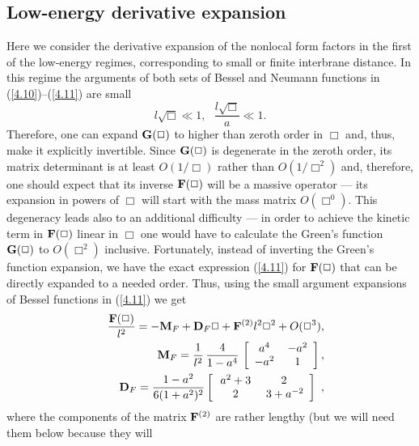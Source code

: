 \documentclass[a4paper,preprint,nofootinbib,
                 showpacs,preprintnumbers,amsmath,amssymb]{revtex4}
\begin{document}
\subsection{Low-energy derivative expansion  
\label{particle}} 
Here we consider the derivative expansion of the nonlocal form factors 
in the first of the low-energy regimes, corresponding to 
small or finite interbrane distance. In this regime the arguments 
of both sets of Bessel and Neumann functions in 
(\ref{4.10})--(\ref{4.11}) are small 
    \begin{equation} 
    l\sqrt\Box\ll 1,\,\,\,\, \frac{l\sqrt\Box}a\ll 1.  \label{4.19} 
    \end{equation} 
Therefore, one can expand ${\bf G}(\Box)$ to higher than 
zeroth order in $\Box$ and, thus, make it explicitly invertible. 
Since ${\bf G}(\Box)$ is degenerate in the zeroth order, its 
matrix determinant is at least $O(1/\Box)$ rather than 
$O(1/\Box^2)$ and, therefore, one should expect that its inverse 
${\bf F}(\Box)$ will be a massive operator 
--- its expansion in powers of $\Box$ will start with the mass 
matrix $O(\Box^0)$. This degeneracy leads also to an additional 
difficulty --- in order to achieve the kinetic term in ${\bf 
F}(\Box)$ linear in $\Box$ one would have to calculate the Green's 
function ${\bf G}(\Box)$ to $O(\Box^2)$ inclusive.  
Fortunately, instead of inverting the Green's function expansion, 
we have the exact expression (\ref{4.11}) for ${\bf F}(\Box)$ that 
can be directly expanded to a needed order. Thus, using the small  
argument expansions of Bessel functions in (\ref{4.11}) we get 
    \begin{eqnarray} 
    &&\frac{\bf F(\Box)}{l^2}= 
    -{\bf M}_F+{\bf D}_F\Box+ 
    {\bf F}^{(2)}l^2\Box^2+O(\Box^3),    \label{4.26}\\ 
    &&{\bf M}_F=\frac1{l^2}\,\frac4{1-a^4}\, 
    \left[\begin{array}{cc} 
    \,a^4\, & \,-a^2 \\ 
    -a^2 & \,1 \end{array}\right],      \label{4.27}\\ 
    &&{\bf D}_F=\frac{1-a^2}{6(1+a^2)^2} 
    \left[\begin{array}{cc} 
    \,a^2+3\, & 2 \\ 
    2 & \,3+a^{-2} 
    \end{array}\right]\ ,                 \label{4.28} 
    \end{eqnarray} 
where the components of the matrix ${\bf F}^{(2)}$ are rather  
lengthy (but we will need them below because they will  
\end{document}
